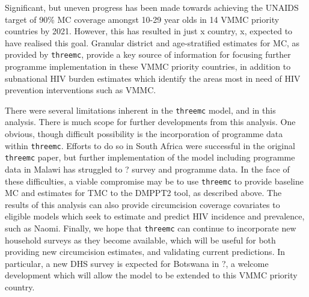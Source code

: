 \documentclass{article}
\begin{document}
Significant, but uneven progress has been made towards achieving the UNAIDS target of 90\% 
MC coverage amongst 10-29 year olds in 14 VMMC priority countries by 2021.  
However, this has resulted in just x country, x, expected to have realised this goal.
Granular district and age-stratified estimates for MC, as provided by \verb|threemc|, provide a key source of information for focusing further programme implementation in these VMMC priority countries, in addition to subnational HIV burden estimates which identify the areas most in need of HIV prevention interventions such as VMMC. 


There were several limitations inherent in the \verb|threemc| model, and in this analysis. 
There is much scope for further developments from this analysis. 
One obvious, though difficult possibility is the incorporation of programme data within \verb|threemc|. 
Efforts to do so in South Africa were successful in the original \verb|threemc| paper, but further implementation of the model including programme data in Malawi has struggled to ? survey and programme data. 
In the face of these difficulties, a viable compromise may be to use \verb|threemc| to provide baseline MC and estimates for TMC to the DMPPT2 tool, as described above. 
The results of this analysis can also provide circumcision coverage covariates to eligible models which seek to estimate and predict HIV incidence and prevalence, such as Naomi. 
Finally, we hope that \verb|threemc| can continue to incorporate new household surveys as they become available, which will be useful for both providing new circumcision estimates, and validating current predictions. 
In particular, a new DHS survey is expected for Botswana in ?, a welcome development which will allow the model to be extended to this VMMC priority country. 
\end{document}

